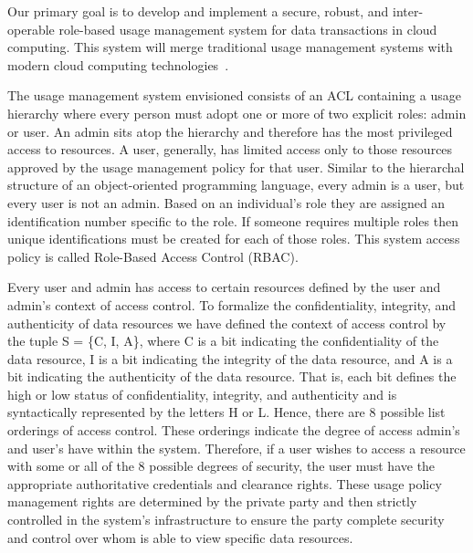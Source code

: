 \documentclass{sig-alternate}
\begin{document}
Our primary goal is to develop and implement a secure, robust, and inter-operable role-based usage management system for data transactions in cloud computing. This system will merge traditional usage management systems with modern cloud computing technologies~\cite{Jamkhedkar:2010:IUM:1866870.1866885}.

The usage management system envisioned consists of an ACL containing a usage hierarchy where every person must adopt one or more of two explicit roles: admin or user. An admin sits atop the hierarchy and therefore has the most privileged access to resources. A user, generally, has limited access only to those resources approved by the usage management policy for that user. Similar to the hierarchal structure of an object-oriented programming language, every admin is a user, but every user is not an admin. Based on an individual's role they are assigned an identification number specific to the role. If someone requires multiple roles then unique identifications must be created for each of those roles. This system access policy is called Role-Based Access Control (RBAC). 

Every user and admin has access to certain resources defined by the user and admin's context of access control.  To formalize the confidentiality, integrity, and authenticity of data resources we have defined the context of access control by the tuple S = \{C, I, A\}, where C is a bit indicating the confidentiality of the data resource, I is a bit indicating the integrity of the data resource, and A is a bit indicating the authenticity of the data resource. That is, each bit defines the high or low status of confidentiality, integrity, and authenticity and is syntactically represented by the letters H or L.  Hence, there are 8 possible list orderings of access control.  These orderings indicate the degree of access admin's and user's have within the system. Therefore, if a user wishes to access a resource with some or all of the 8 possible degrees of security, the user must have the appropriate authoritative credentials and clearance rights.  These usage policy management rights are determined by the private party and then strictly controlled in the system's infrastructure to ensure the party complete security and control over whom is able to view specific data resources.
\end{document}

